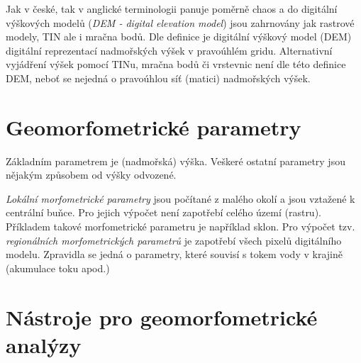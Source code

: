 Jak v české, tak v anglické terminologii panuje poměrně chaos a do digitální výškových modelů (\textit{DEM - digital elevation model}) jsou zahrnovány jak rastrové modely, TIN ale i mračna bodů. Dle definice \textcite{guthDigitalElevationModels2021} je digitální výškový model (DEM) digitální reprezentací nadmořských výšek v pravoúhlém gridu. Alternativní vyjádření výšek pomocí TINu, mračna bodů či vrstevnic není dle této definice DEM, neboť se nejedná o pravoúhlou síť (matici) nadmořských výšek.

	 


\section{Geomorfometrické parametry}
Základním parametrem je (nadmořská) výška. Veškeré ostatní parametry jsou nějakým způsobem od výšky odvozené.  

\emph{Lokální morfometrické parametry} jsou počítané z malého okolí a jsou vztažené k centrální buňce. Pro jejich výpočet není zapotřebí celého území (rastru). Příkladem takové morfometrické parametru je například sklon.
Pro výpočet tzv. \emph{regionálních morfometrických parametrů} je zapotřebí všech pixelů digitálního modelu. Zpravidla se jedná o parametry, které souvisí s tokem vody v krajině (akumulace toku apod.)  

\section{Nástroje pro geomorfometrické analýzy}
